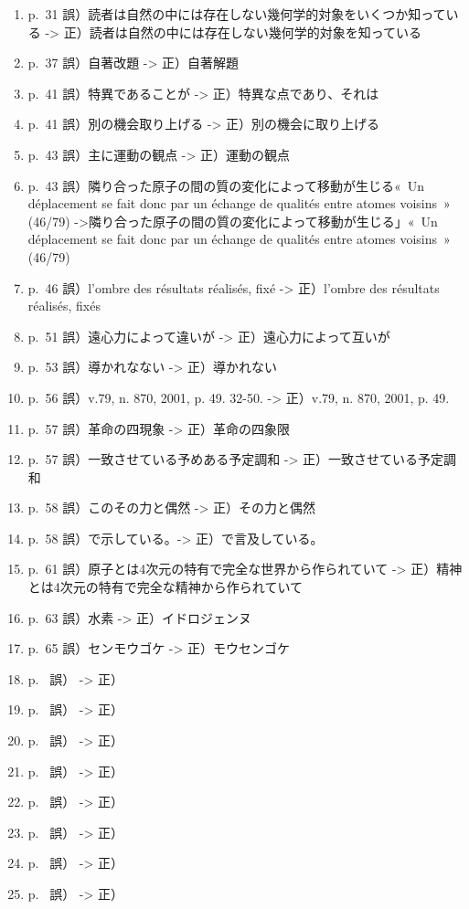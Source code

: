 \begin{enumerate}
  \item p.~31 誤）読者は自然の中には存在しない幾何学的対象をいくつか知っている -> 正）読者は自然の中には存在しない幾何学的対象を知っている
  \item p.~37 誤）自著改題 -> 正）自著解題
  \item p.~41 誤）特異であることが -> 正）特異な点であり、それは
  \item p.~41 誤）別の機会取り上げる -> 正）別の機会に取り上げる
  \item p.~43 誤）主に運動の観点 -> 正）運動の観点
  \item p.~43 誤）隣り合った原子の間の質の変化によって移動が生じる«~Un déplacement se fait donc par un échange de qualités entre atomes voisins~» (46/79) ->隣り合った原子の間の質の変化によって移動が生じる」«~Un déplacement se fait donc par un échange de qualités entre atomes voisins~» (46/79) 
  \item p.~46 誤）l'ombre des résultats réalisés, fixé -> 正）l'ombre des résultats réalisés, fixés
  \item p.~51 誤）遠心力によって違いが -> 正）遠心力によって互いが
  \item p.~53 誤）導かれなない -> 正）導かれない
  \item p.~56 誤）v.79, n. 870, 2001, p. 49. 32-50. -> 正）v.79, n. 870, 2001, p. 49.
  \item p.~57 誤）革命の四現象 -> 正）革命の四象限
  \item p.~57 誤）一致させている予めある予定調和 -> 正）一致させている予定調和
  \item p.~58 誤）このその力と偶然 -> 正）その力と偶然
  \item p.~58 誤）で示している。-> 正）で言及している。
  \item p.~61 誤）原子とは4次元の特有で完全な世界から作られていて -> 正）精神とは4次元の特有で完全な精神から作られていて
  \item p.~63 誤）水素 -> 正）イドロジェンヌ
  \item p.~65 誤）センモウゴケ -> 正）モウセンゴケ
  \item p.~ 誤） -> 正）
  \item p.~ 誤） -> 正）
  \item p.~ 誤） -> 正）
  \item p.~ 誤） -> 正）
  \item p.~ 誤） -> 正）
  \item p.~ 誤） -> 正）
  \item p.~ 誤） -> 正）
  \item p.~ 誤） -> 正）

\end{enumerate}
